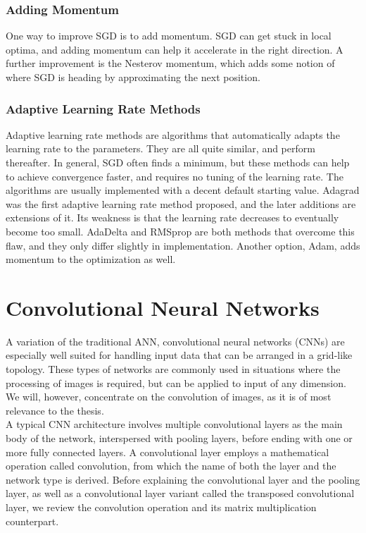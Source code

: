 \subsubsection{Adding Momentum}

One way to improve SGD is to add momentum. SGD can get stuck in local optima, and adding momentum can help it accelerate in the right direction. A further improvement is the Nesterov momentum, which adds some notion of where SGD is heading by approximating the next position.

\subsubsection{Adaptive Learning Rate Methods}

Adaptive learning rate methods are algorithms that automatically adapts the learning rate to the parameters. They are all quite similar, and perform thereafter. In general, SGD often finds a minimum, but these methods can help to achieve convergence faster, and requires no tuning of the learning rate. The algorithms are usually implemented with a decent default starting value. Adagrad was the first adaptive learning rate method proposed, and the later additions are extensions of it. Its weakness is that the learning rate decreases to eventually become too small. AdaDelta and RMSprop are both methods that overcome this flaw, and they only differ slightly in implementation. Another option, Adam, adds momentum to the optimization as well.

\section{Convolutional Neural Networks} \label{conv-networks}

A variation of the traditional ANN, convolutional neural networks (CNNs) are especially well suited for handling input data that can be arranged in a grid-like topology. These types of networks are commonly used in situations where the processing of images is required, but can be applied to input of any dimension. We will, however, concentrate on the convolution of images, as it is of most relevance to the thesis. \\

\noindent A typical CNN architecture involves multiple convolutional layers as the main body of the network, interspersed with pooling layers, before ending with one or more fully connected layers. A convolutional layer employs a mathematical operation called convolution, from which the name of both the layer and the network type is derived. Before explaining the convolutional layer and the pooling layer, as well as a convolutional layer variant called the transposed convolutional layer, we review the convolution operation and its matrix multiplication counterpart.

